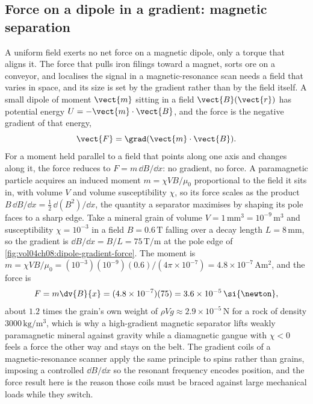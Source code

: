 

\subsection{Force on a dipole in a gradient: magnetic separation}

A uniform field exerts no net force on a magnetic dipole, only a torque
that aligns it. The force that pulls iron filings toward a magnet, sorts
ore on a conveyor, and localises the signal in a magnetic-resonance scan
needs a field that varies in space, and its size is set by the gradient
rather than by the field itself. A small dipole of moment $\vect{m}$ sitting
in a field $\vect{B}(\vect{r})$ has potential energy $U = -\vect{m}\cdot
\vect{B}$, and the force is the negative gradient of that energy,
\[
\vect{F} = \grad(\vect{m}\cdot\vect{B}).
\]
For a moment held parallel to a field that points along one axis and
changes along it, the force reduces to $F = m\,\dd B/\dd x$: no gradient,
no force. A paramagnetic particle acquires an induced moment $m = \chi V
B/\mu_0$ proportional to the field it sits in, with volume $V$ and volume
susceptibility $\chi$, so its force scales as the product $B\,\dd B/\dd x =
\tfrac12\,\dd(B^2)/\dd x$, the quantity a separator maximises by shaping
its pole faces to a sharp edge. Take a mineral grain of volume $V = 1\,\si{
\milli\meter\cubed} = 10^{-9}\,\si{\meter\cubed}$ and susceptibility
$\chi = 10^{-3}$ in a field $B = 0.6\,\si{\tesla}$ falling over a decay
length $L = 8\,\si{\milli\meter}$, so the gradient is $\dd B/\dd x = B/L =
75\,\si{\tesla\per\meter}$ at the pole edge of
\cref{fig:vol04ch08:dipole-gradient-force}. The moment is $m = \chi V B/
\mu_0 = (10^{-3})(10^{-9})(0.6)/(4\pi\times 10^{-7}) = 4.8\times 10^{-7}\,
\si{\ampere\meter\squared}$, and the force is
\[
F = m\dv{B}{x} = (4.8\times 10^{-7})(75) = 3.6\times 10^{-5}\,\si{\newton},
\]
about $1.2$ times the grain's own weight of $\rho V g \approx 2.9\times
10^{-5}\,\si{\newton}$ for a rock of density $3000\,\si{\kilogram\per\meter
\cubed}$, which is why a high-gradient magnetic separator lifts weakly
paramagnetic mineral against gravity while a diamagnetic gangue with $\chi <
0$ feels a force the other way and stays on the belt. The gradient coils of
a magnetic-resonance scanner apply the same principle to spins rather than
grains, imposing a controlled $\dd B/\dd x$ so the resonant frequency
encodes position, and the force result here is the reason those coils must
be braced against large mechanical loads while they switch.

